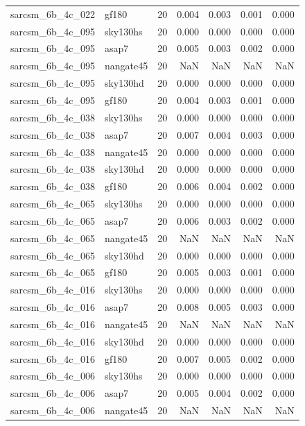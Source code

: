 \begin{tabular}{llrrrrr}
sarcsm\_6b\_4c\_022 & gf180 & 20 & 0.004 & 0.003 & 0.001 & 0.000 \\
sarcsm\_6b\_4c\_095 & sky130hs & 20 & 0.000 & 0.000 & 0.000 & 0.000 \\
sarcsm\_6b\_4c\_095 & asap7 & 20 & 0.005 & 0.003 & 0.002 & 0.000 \\
sarcsm\_6b\_4c\_095 & nangate45 & 20 & NaN & NaN & NaN & NaN \\
sarcsm\_6b\_4c\_095 & sky130hd & 20 & 0.000 & 0.000 & 0.000 & 0.000 \\
sarcsm\_6b\_4c\_095 & gf180 & 20 & 0.004 & 0.003 & 0.001 & 0.000 \\
sarcsm\_6b\_4c\_038 & sky130hs & 20 & 0.000 & 0.000 & 0.000 & 0.000 \\
sarcsm\_6b\_4c\_038 & asap7 & 20 & 0.007 & 0.004 & 0.003 & 0.000 \\
sarcsm\_6b\_4c\_038 & nangate45 & 20 & 0.000 & 0.000 & 0.000 & 0.000 \\
sarcsm\_6b\_4c\_038 & sky130hd & 20 & 0.000 & 0.000 & 0.000 & 0.000 \\
sarcsm\_6b\_4c\_038 & gf180 & 20 & 0.006 & 0.004 & 0.002 & 0.000 \\
sarcsm\_6b\_4c\_065 & sky130hs & 20 & 0.000 & 0.000 & 0.000 & 0.000 \\
sarcsm\_6b\_4c\_065 & asap7 & 20 & 0.006 & 0.003 & 0.002 & 0.000 \\
sarcsm\_6b\_4c\_065 & nangate45 & 20 & NaN & NaN & NaN & NaN \\
sarcsm\_6b\_4c\_065 & sky130hd & 20 & 0.000 & 0.000 & 0.000 & 0.000 \\
sarcsm\_6b\_4c\_065 & gf180 & 20 & 0.005 & 0.003 & 0.001 & 0.000 \\
sarcsm\_6b\_4c\_016 & sky130hs & 20 & 0.000 & 0.000 & 0.000 & 0.000 \\
sarcsm\_6b\_4c\_016 & asap7 & 20 & 0.008 & 0.005 & 0.003 & 0.000 \\
sarcsm\_6b\_4c\_016 & nangate45 & 20 & NaN & NaN & NaN & NaN \\
sarcsm\_6b\_4c\_016 & sky130hd & 20 & 0.000 & 0.000 & 0.000 & 0.000 \\
sarcsm\_6b\_4c\_016 & gf180 & 20 & 0.007 & 0.005 & 0.002 & 0.000 \\
sarcsm\_6b\_4c\_006 & sky130hs & 20 & 0.000 & 0.000 & 0.000 & 0.000 \\
sarcsm\_6b\_4c\_006 & asap7 & 20 & 0.005 & 0.004 & 0.002 & 0.000 \\
sarcsm\_6b\_4c\_006 & nangate45 & 20 & NaN & NaN & NaN & NaN \\

\end{tabular}
